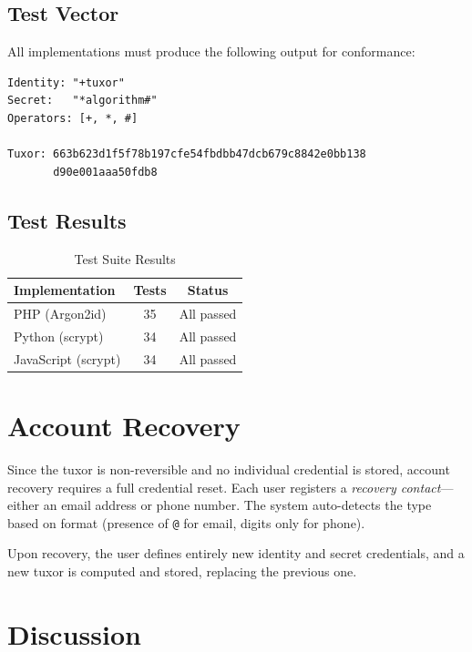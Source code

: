 \documentclass[11pt,a4paper]{article}
\begin{document}
\subsection{Test Vector}

All implementations must produce the following output for conformance:

\begin{lstlisting}
Identity: "+tuxor"
Secret:   "*algorithm#"
Operators: [+, *, #]

Tuxor: 663b623d1f5f78b197cfe54fbdbb47dcb679c8842e0bb138
       d90e001aaa50fdb8
\end{lstlisting}

\subsection{Test Results}

\begin{table}[h]
\centering
\caption{Test Suite Results}
\label{tab:tests}
\begin{tabular}{@{}lcc@{}}
\toprule
Implementation & Tests & Status \\
\midrule
PHP (Argon2id) & 35 & All passed \\
Python (scrypt) & 34 & All passed \\
JavaScript (scrypt) & 34 & All passed \\
\bottomrule
\end{tabular}
\end{table}

\section{Account Recovery}

Since the tuxor is non-reversible and no individual credential is stored, account recovery requires a full credential reset. Each user registers a \textit{recovery contact}---either an email address or phone number. The system auto-detects the type based on format (presence of \texttt{@} for email, digits only for phone).

Upon recovery, the user defines entirely new identity and secret credentials, and a new tuxor is computed and stored, replacing the previous one.

\section{Discussion}
\end{document}
